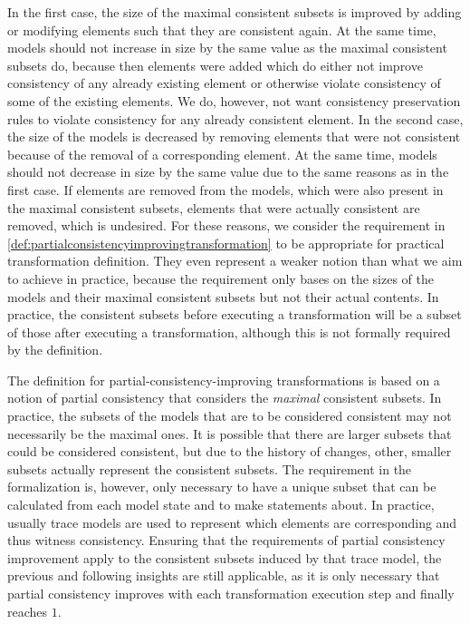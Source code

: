 In the first case, the size of the maximal consistent subsets is improved by adding or modifying elements such that they are consistent again.
At the same time, models should not increase in size by the same value as the maximal consistent subsets do, because then elements were added which do either not improve consistency of any already existing element or otherwise violate consistency of some of the existing elements.
We do, however, not want consistency preservation rules to violate consistency for any already consistent element.
In the second case, the size of the models is decreased by removing elements that were not consistent because of the removal of a corresponding element.
At the same time, models should not decrease in size by the same value due to the same reasons as in the first case.
If elements are removed from the models, which were also present in the maximal consistent subsets, elements that were actually consistent are removed, which is undesired.
For these reasons, we consider the requirement in \autoref{def:partialconsistencyimprovingtransformation} to be appropriate for practical transformation definition.
They even represent a weaker notion than what we aim to achieve in practice, because the requirement only bases on the sizes of the models and their maximal consistent subsets but not their actual contents.
In practice, the consistent subsets before executing a transformation will be a subset of those after executing a transformation, although this is not formally required by the definition.

\begin{remark}
    The definition for partial-consistency-improving transformations is based on a notion of partial consistency that considers the \emph{maximal} consistent subsets.
    In practice, the subsets of the models that are to be considered consistent may not necessarily be the maximal ones.
    It is possible that there are larger subsets that could be considered consistent, but due to the history of changes, other, smaller subsets actually represent the consistent subsets.
    The requirement in the formalization is, however, only necessary to have a unique subset that can be calculated from each model state and to make statements about.
    In practice, usually trace models are used to represent which elements are corresponding and thus witness consistency.
    Ensuring that the requirements of partial consistency improvement apply to the consistent subsets induced by that trace model, the previous and following insights are still applicable, as it is only necessary that partial consistency improves with each transformation execution step and finally reaches $1$.
\end{remark}

